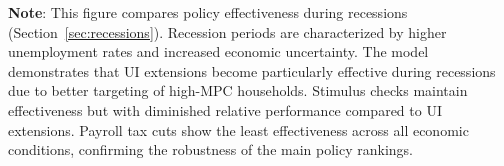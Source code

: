 \documentclass{econsocart}
\begin{document}
\noindent\parbox{\textwidth}{\footnotesize
  \textbf{Note}: This figure compares policy effectiveness during recessions (Section~\ref{sec:recessions}).
  Recession periods are characterized by higher unemployment rates and increased economic uncertainty.
  The model demonstrates that UI extensions become particularly effective during recessions due to
  better targeting of high-MPC households. Stimulus checks maintain effectiveness but with diminished
  relative performance compared to UI extensions. Payroll tax cuts show the least effectiveness
  across all economic conditions, confirming the robustness of the main policy rankings.
}

\vspace{1em}
\FloatBarrier %
\end{document}
